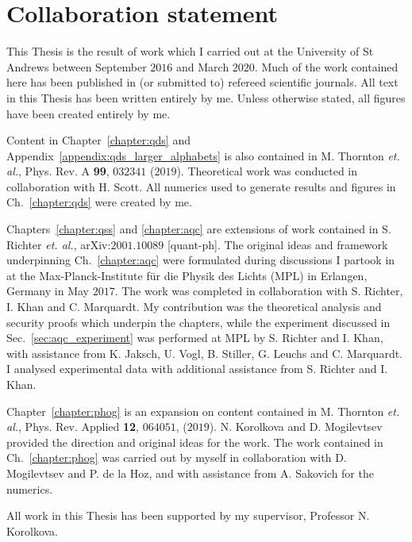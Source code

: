 \chapter*{\hfill Collaboration statement}

This Thesis is the result of work which I carried out at the University of St Andrews between September $2016$ and March $2020$. Much of the work contained here has been published in (or submitted to) refereed scientific journals. All text in this Thesis has been written entirely by me. Unless otherwise stated, all figures have been created entirely by me.

Content in Chapter~\ref{chapter:qds} and Appendix~\ref{appendix:qds_larger_alphabets} is also contained in M. Thornton \emph{et. al.}, Phys. Rev. A \textbf{99}, $032341$ ($2019$). Theoretical work was conducted in collaboration with H. Scott. All numerics used to generate results and figures in Ch.~\ref{chapter:qds} were created by me. 

Chapters~\ref{chapter:qss} and \ref{chapter:aqc} are extensions of work contained in S. Richter \emph{et. al.}, arXiv:$2001.10089$ [quant-ph]. The original ideas and framework underpinning Ch.~\ref{chapter:aqc} were formulated during discussions I partook in at the Max-Planck-Institute f{\"u}r die Physik des Lichts (MPL) in Erlangen, Germany in May $2017$. The work was completed in collaboration with S. Richter, I. Khan and C. Marquardt. My contribution was the theoretical analysis and security proofs which underpin the chapters, while the experiment discussed in Sec.~\ref{sec:aqc_experiment} was performed at MPL by S. Richter and I. Khan, with assistance from K. Jaksch, U. Vogl, B. Stiller, G. Leuchs and C. Marquardt. I analysed experimental data with additional assistance from S. Richter and I. Khan. 

Chapter~\ref{chapter:phog} is an expansion on content contained in M. Thornton \emph{et. al.}, Phys. Rev. Applied \textbf{12}, $064051$, ($2019$). N. Korolkova and D. Mogilevtsev provided the direction and original ideas for the work. The work contained in Ch.~\ref{chapter:phog} was carried out by myself in collaboration with D. Mogilevtsev and P. de la Hoz, and with assistance from A. Sakovich for the numerics. 

All work in this Thesis has been supported by my supervisor, Professor N. Korolkova.
